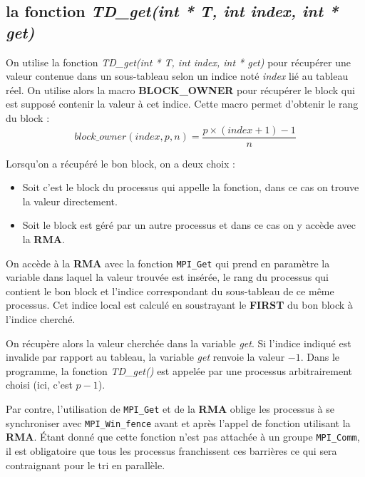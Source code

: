 \subsection*{la fonction \textit{TD\_get(int * T, int index, int * get)}}

On utilise la fonction \textit{TD\_get(int * T, int index, int * get)} pour récupérer une valeur contenue dans un sous-tableau selon un indice noté \textit{index} lié au tableau réel. On utilise alors la macro \textbf{BLOCK\_OWNER} pour récupérer le block qui est supposé contenir la valeur à cet indice. Cette macro permet d'obtenir le rang du block :
$$
block\_owner(index,p,n) = \frac{p \times (index + 1) - 1}{n}
$$

Lorsqu'on a récupéré le bon block, on a deux choix :
\begin{itemize}
    \item Soit c'est le block du processus qui appelle la fonction, dans ce cas on trouve la valeur directement.
    \item Soit le block est géré par un autre processus et dans ce cas on y accède avec la \textbf{RMA}.
\end{itemize}



On accède à la \textbf{RMA} avec la fonction \verb+MPI_Get+ qui prend en paramètre la variable dans laquel la valeur trouvée est insérée, le rang du processus qui contient le bon block et l'indice correspondant du sous-tableau de ce même processus. Cet indice local est calculé en soustrayant le \textbf{FIRST} du bon block à l'indice cherché. 



On récupère alors la valeur cherchée dans la variable \textit{get}. Si l'indice indiqué est invalide par rapport au tableau, la variable \textit{get} renvoie la valeur $-1$. Dans le programme, la fonction \textit{TD\_get()} est appelée par une processus arbitrairement choisi (ici, c'est $p-1$).

Par contre, l'utilisation de \verb+MPI_Get+ et de la \textbf{RMA} oblige les processus à se synchroniser avec \verb+MPI_Win_fence+ avant et après l'appel de fonction utilisant la \textbf{RMA}. Étant donné que cette fonction n'est pas attachée à un groupe \verb+MPI_Comm+, il est obligatoire que tous les processus franchissent ces barrières ce qui sera contraignant pour le tri en parallèle.

